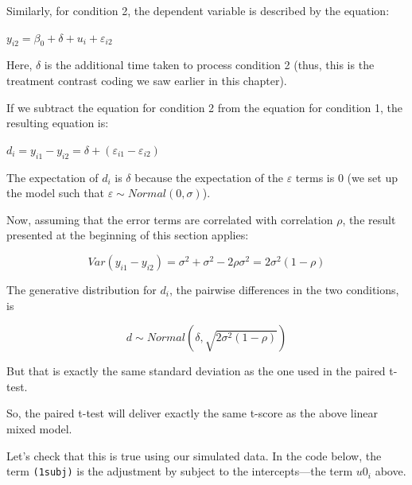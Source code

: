 \documentclass[12pt,]{krantz}
\newenvironment{Shaded}{\begin{snugshade}}{\end{snugshade}}
\newcommand{\DataTypeTok}[1]{\textcolor[rgb]{0.13,0.29,0.53}{#1}}
\newcommand{\DecValTok}[1]{\textcolor[rgb]{0.00,0.00,0.81}{#1}}
\newcommand{\KeywordTok}[1]{\textcolor[rgb]{0.13,0.29,0.53}{\textbf{#1}}}
\newcommand{\NormalTok}[1]{#1}
\newcommand{\OperatorTok}[1]{\textcolor[rgb]{0.81,0.36,0.00}{\textbf{#1}}}
\begin{document}
Similarly, for condition 2, the dependent variable is described by the equation:

\(y_{i2} = \beta_0 + \delta + u_i + \varepsilon_{i2}\)

Here, \(\delta\) is the additional time taken to process condition 2 (thus, this is the treatment contrast coding we saw earlier in this chapter).

If we subtract the equation for condition 2 from the equation for condition 1, the resulting equation is:

\(d_i=y_{i1} - y_{i2}= \delta + (\varepsilon_{i1}-\varepsilon_{i2})\)

The expectation of \(d_i\) is \(\delta\) because the expectation of the \(\varepsilon\) terms is 0 (we set up the model such that \(\varepsilon \sim Normal(0,\sigma)\)).

Now, assuming that the error terms are correlated with correlation \(\rho\), the result presented at the beginning of this section applies:

\begin{equation}
Var(y_{i1}-y_{i2}) = \sigma^2 + \sigma^2-2\rho\sigma^2=2\sigma^2(1-\rho)
\end{equation}

The generative distribution for \(d_i\), the pairwise differences in the two conditions, is

\begin{equation}
d \sim Normal(\delta, \sqrt{2\sigma^2(1-\rho)})
\end{equation}

But that is exactly the same standard deviation as the one used in the paired t-test.

So, the paired t-test will deliver exactly the same t-score as the above linear mixed model.

Let's check that this is true using our simulated data. In the code below, the term \texttt{(1\textbar{}subj)} is the adjustment by subject to the intercepts---the term \(u0_i\) above.

\begin{Shaded}
\end{Shaded}
\end{document}
